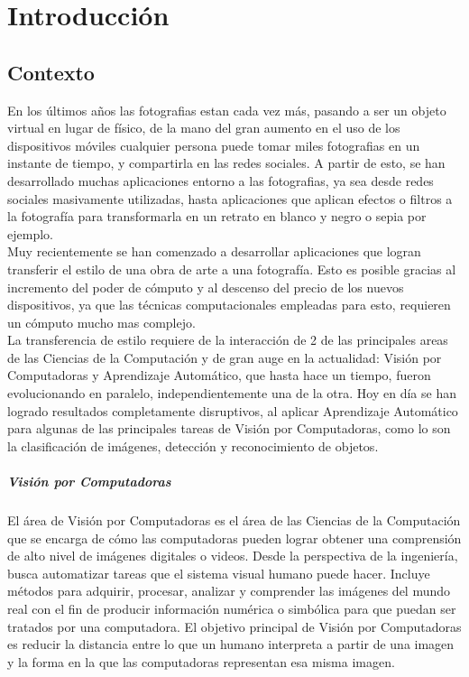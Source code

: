 \documentclass[a4paper,11pt,spanish]{book}
\begin{document}
\tableofcontents

\chapter{Introducción}
  \section {Contexto}
    En los últimos años las fotografias estan cada vez más, pasando a ser un objeto virtual en lugar de físico, de la mano del gran aumento en el uso de los dispositivos móviles
    cualquier persona puede tomar miles fotografias en un instante de tiempo, y compartirla en las redes sociales.
    A partir de esto, se han desarrollado muchas aplicaciones entorno a las fotografias, ya sea desde redes sociales masivamente utilizadas, hasta aplicaciones que aplican efectos o filtros
    a la fotografía para transformarla en un retrato en blanco y negro o sepia por ejemplo. \\
    Muy recientemente se han comenzado a desarrollar aplicaciones que logran transferir el estilo de una obra de arte a una fotografía. Esto es posible gracias al incremento
    del poder de cómputo y al descenso del precio de los nuevos dispositivos, ya que las técnicas computacionales empleadas para esto, requieren un cómputo mucho mas complejo.\\
    La transferencia de estilo requiere de la interacción de 2 de las principales areas de las Ciencias de la Computación y de gran auge en la actualidad: Visión por Computadoras y Aprendizaje Automático,
    que hasta hace un tiempo, fueron evolucionando en paralelo, independientemente una de la otra. Hoy en día se han logrado resultados completamente disruptivos, al aplicar
    Aprendizaje Automático para algunas de las principales tareas de Visión por Computadoras, como lo son la clasificación de imágenes, detección y reconocimiento de objetos.\\
    \paragraph{Visión por Computadoras}
      El área de Visión por Computadoras es el área de las Ciencias de la Computación que se encarga de cómo las computadoras pueden lograr obtener una comprensión de alto nivel de imágenes digitales o videos.
      Desde la perspectiva de la ingeniería, busca automatizar tareas que el sistema visual humano puede hacer. Incluye métodos para adquirir, procesar, analizar y comprender las imágenes del mundo real
      con el fin de producir información numérica o simbólica para que puedan ser tratados por una computadora. El objetivo principal de Visión por Computadoras es reducir la distancia
      entre lo que un humano interpreta a partir de una imagen y la forma en la que las computadoras representan esa misma imagen.\\
\end{document}
